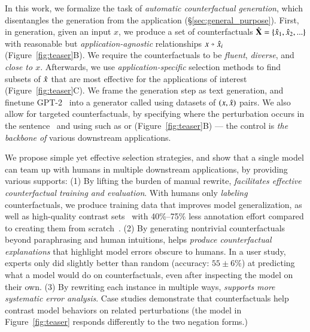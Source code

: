 In this work, we formalize the task of \emph{automatic counterfactual generation}, which disentangles the generation from the application (\S\ref{sec:general_purpose}).
First, in generation, given an input $x$, we produce a set of counterfactuals $\hat{\mathbf{X}} = \{\hat{x}_1, \hat{x}_2, ...\}$ with reasonable but \emph{application-agnostic} relationships $x \veryshortarrow \xp_i$ (Figure~\ref{fig:teaser}B).
We require the counterfactuals to be \emph{fluent}, \emph{diverse}, and \emph{close to $x$}.
Afterwards, we use \emph{application-specific} selection methods to find subsets of $\hat{x}$ that are most effective for the applications of interest (Figure~\ref{fig:teaser}C).
We frame the generation step as text generation, and finetune GPT-2~\cite{radford2019language} into a generator called \emph{\sysname} using datasets of $(x, \hat{x})$ pairs. 
We also allow for targeted counterfactuals, by specifying where the perturbation occurs in the sentence~\cite{donahue2020enabling} and using \tagstrs such as  or  (Figure~\ref{fig:teaser}B) --- the control is \emph{the backbone of} various downstream applications.

We propose simple yet effective selection strategies, and show that a single \sysname model can team up with humans in multiple downstream applications, by providing various supports: 
(1) 
By lifting the burden of manual rewrite, \sysname \emph{facilitates effective counterfactual training and evaluation}.
With humans only \emph{labeling} counterfactuals, we produce training data that improves model generalization, as well as high-quality contrast sets~\cite{gardner2020contrast} with 40\%--75\% less annotation effort compared to creating them from scratch~\cite{kaushik2019learning}. 
(2) 
By generating nontrivial counterfactuals beyond paraphrasing and human intuitions, \sysname helps \emph{produce counterfactual explanations} that highlight model errors obscure to humans. 
In a user study, experts only did slightly better than random (accuracy: $55 \pm 6\%$) at predicting what a model would do on \sysname counterfactuals, even after inspecting the model on their own.
(3) 
By rewriting each instance in multiple ways, \sysname \emph{supports more systematic error analysis}.
Case studies demonstrate that \sysname counterfactuals help contrast model behaviors on related perturbations (\eg the model in Figure~\ref{fig:teaser} responds differently to the two negation forms.)

